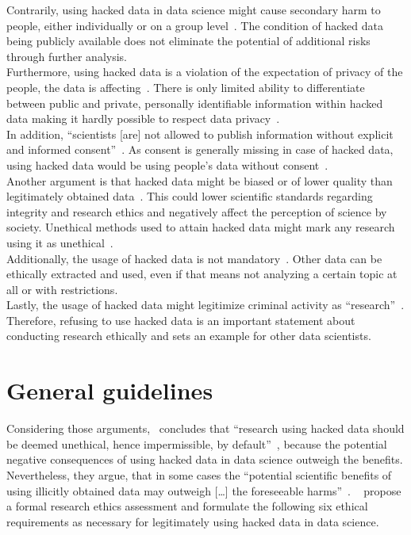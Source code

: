 Contrarily, using hacked data in data science might cause secondary harm to people, either individually or on a group level~\parencites[][746]{nature}[23]{acm}.
The condition of hacked data being publicly available does not eliminate the potential of additional risks through further analysis.\\
Furthermore, using hacked data is a violation of the expectation of privacy of the people, the data is affecting~\parencite[][5]{patreon}.
There is only limited ability to differentiate between public and private, personally identifiable information within hacked data making it hardly possible to respect data privacy~\parencite[][746]{nature}.\\
In addition, ``scientists [are] not allowed to publish information without explicit and informed consent''~\parencite[][745]{nature}.
As consent is generally missing in case of hacked data, using hacked data would be using people's data without consent~\parencite[][5]{patreon}.\\
Another argument is that hacked data might be biased or of lower quality than legitimately obtained data~\parencite[][746]{nature}.
This could lower scientific standards regarding integrity and research ethics and negatively affect the perception of science by society.
Unethical methods used to attain hacked data might mark any research using it as unethical~\parencite[][24]{acm}.\\
Additionally, the usage of hacked data is not mandatory~\parencite[][5]{patreon}.
Other data can be ethically extracted and used, even if that means not analyzing a certain topic at all or with restrictions.\\
Lastly, the usage of hacked data might legitimize criminal activity as ``research''~\parencites[][5]{patreon}[][24]{acm}.
Therefore, refusing to use hacked data is an important statement about conducting research ethically and sets an example for other data scientists.

\section*{General guidelines}

Considering those arguments,~\textcite{nature} concludes that ``research using hacked data should be deemed unethical, hence impermissible, by default''~\parencite[][747]{nature}, because the potential negative consequences of using hacked data in data science outweigh the benefits.
Nevertheless, they argue, that in some cases the ``potential scientific benefits of using illicitly obtained data may outweigh [\ldots] the foreseeable harms''~\parencite[][747]{nature}.
~\textcite[747-748]{nature} propose a formal research ethics assessment and formulate the following six ethical requirements as necessary for legitimately using hacked data in data science.

